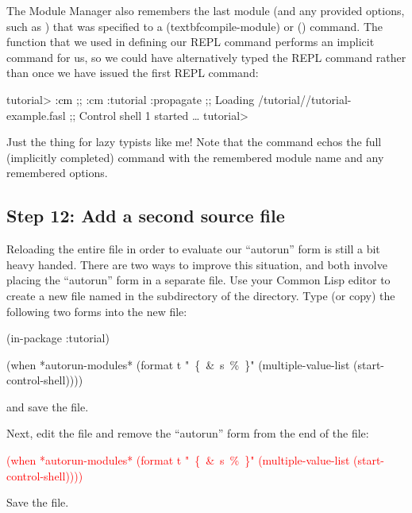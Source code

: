 \documentclass[10pt,twoside,english,pdftex]{article}
\begin{document}
The Module Manager also remembers the last module (and any provided options,
such as ) that was specified to a 
(textbf{compile-module}) or  () command.
The  function that we used in defining our
 REPL command performs an implicit  command for us,
so we could have alternatively typed the  REPL command rather than
 once we have issued the first  REPL command:
%
\W\supp
\begin{smallexample}
\textcolor{darkergray}{%
  tutorial> \textcolor{black}{:cm}
  ;; :cm :tutorial :propagate
  ;; Loading /tutorial//tutorial-example.fasl
  ;; Control shell 1 started
     \textrm{\ldots{}}
  tutorial>}
\end{smallexample}
%
Just the thing for lazy typists like me!  Note that the  command
echos the full (implicitly completed) command with the remembered module name
and any remembered options.

\subsection*{Step 12: Add a second source file}

Reloading the entire  file in order to
evaluate our ``autorun'' form is still a bit heavy handed.  There are two ways
to improve this situation, and both involve placing the ``autorun'' form in a
separate file.  Use your Common Lisp editor to create a new file named
 in the  subdirectory of the
 directory. Type (or copy) the following two forms into the new
 file:
%
\W\supp
\begin{example}
  (in-package :tutorial)

  (when *autorun-modules*
    (format t "~\{~\&~s~\%~\}" (multiple-value-list (start-control-shell))))
\end{example}
%
and save the file.  

Next, edit the  file and remove the
``autorun'' form from the end of the file:
% 
\W\supp
\begin{example}
\textcolor{red}{%
  (when *autorun-modules* 
    (format t "~\{~\&~s~\%~\}" (multiple-value-list (start-control-shell))))}
\end{example}
%
Save the file. 
\end{document}
